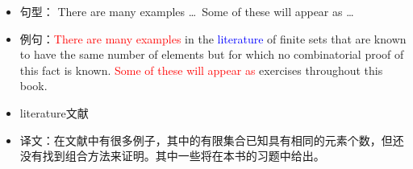 \documentclass[punct]{ctexbeamer}
\newcommand{\red}[1]{\textcolor{red}{#1}}
\newcommand{\blue}[1]{\textcolor{blue}{#1}}
\begin{document}
\begin{frame}
	
	\begin{itemize}
\item 
句型： There are many examples \dots~Some of these will appear as \dots~

\item 例句：{\red{There are many examples}} in the \blue{literature} of finite sets that are known to have the same number of elements but for which no combinatorial proof of this fact is known. \red{Some of these will appear as} exercises throughout this book.

\item  literature文献

\item  译文：在文献中有很多例子，其中的有限集合已知具有相同的元素个数，但还没有找到组合方法来证明。其中一些将在本书的习题中给出。

\end{itemize}
\end{frame}
\end{document}
